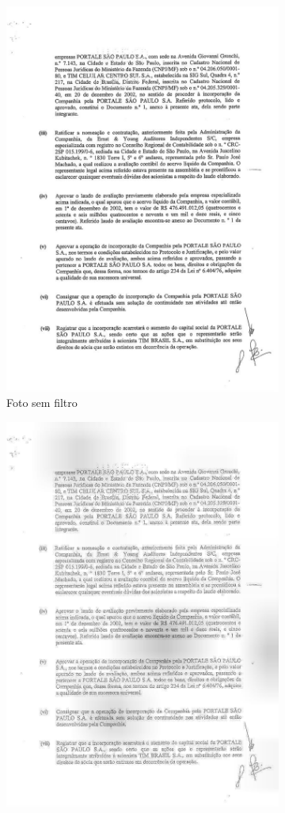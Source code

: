 \begin{figure}[H]
  \centering
  \begin{subfigure}{.5\textwidth}
    \centering
    \includegraphics[width=0.8\linewidth]{figuras/good-text-image.jpg}
    \caption{Foto sem filtro}
    \label{fig:image-without-filter}
  \end{subfigure}%
  \begin{subfigure}{.5\textwidth}
    \centering
    \includegraphics[width=0.8\linewidth]{figuras/image-with-overlay.jpg}

\end{subfigure}
\end{figure}
